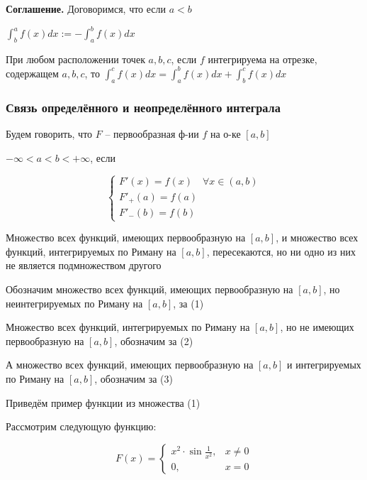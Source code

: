 \textbf{Соглашение.}
Договоримся, что если $a < b$

$\int_b^a f(x)dx := -\int_a^b f(x)dx$

\begin{corollary}
    При любом расположении точек $a, b, c$, если $f$
    интегрируема на отрезке, содержащем $a, b, c$, то
    $\int_a^c f(x) dx = \int_a^b f(x)dx + \int_b^c f(x)dx$
\end{corollary}

\subsubsection{Связь определённого и неопределённого интеграла}
\begin{definition}
    Будем говорить, что $F$ -- первообразная ф-ии $f$ на о-ке $[a, b]$

    $-\infty < a < b < +\infty$, если 

    \begin{equation*} \begin{cases}    
        F'(x) = f(x) \quad \forall x \in (a, b) \\
        F'_+(a) = f(a) \\
        F'_-(b) = f(b)
    \end{cases} \end{equation*}
\end{definition}

\begin{remark}
    Множество всех функций, имеющих первообразную на $[a, b]$,
    и множество всех функций, интегрируемых по Риману на $[a, b]$,
    пересекаются, но ни одно из них не является подмножеством другого

    Обозначим множество всех функций, имеющих первообразную на $[a, b]$, но неинтегрируемых по Риману на $[a, b]$, за (1)

    Множество всех функций, интегрируемых по Риману на $[a, b]$, но не имеющих первообразную на $[a, b]$, обозначим за (2)

    А множество всех функций, имеющих первообразную на $[a, b]$ и интегрируемых по Риману на $[a, b]$, обозначим за (3)
\end{remark}

Приведём пример функции из множества (1)

Рассмотрим следующую функцию:

\begin{equation}
F(x) = \begin{cases}
    x^2\cdot \sin \frac{1}{x^2}, & x \neq 0 \\
    0, & x = 0
\end{cases}
\label{eq:for_not_Reimann_integrable}
\end{equation}

